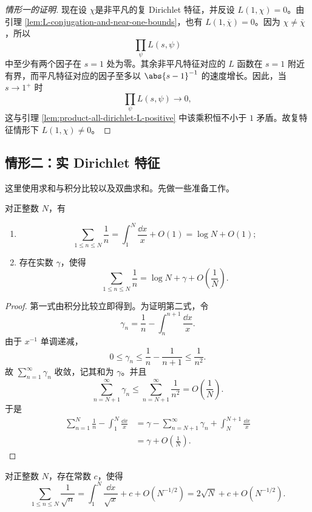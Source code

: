\begin{proof}[情形一的证明]
	现在设 $\chi$是非平凡的复 Dirichlet 特征，并反设
$L(1,\chi)=0$。由引理
\ref{lem:L-conjugation-and-near-one-bounds}，也有
$L(1,\overline\chi)=0$。因为 $\chi\neq\overline\chi$，所以
\[
\prod_\psi L(s,\psi)
\]
中至少有两个因子在 $s=1$ 处为零。其余非平凡特征对应的
$L$ 函数在 $s=1$ 附近有界，而平凡特征对应的因子至多以
$\abs{s-1}^{-1}$ 的速度增长。因此，当 $s\to1^+$ 时
	\[
	\prod_\psi L(s,\psi)\longrightarrow0,
	\]
	这与引理 \ref{lem:product-all-dirichlet-L-positive} 中该乘积恒不小于
$1$ 矛盾。故复特征情形下 $L(1,\chi)\neq0$。

\end{proof}
\subsection*{情形二：实 Dirichlet 特征}

这里使用求和与积分比较以及双曲求和。先做一些准备工作。

\begin{proposition}\label{prop:harmonic-sum-asymptotic}
	对正整数 $N$，有
	\begin{enumerate}[label=\textup{(\roman*)}]
		\item
		\[
		\sum_{1\leq n\leq N}\frac1n
		=\int_1^N\frac{\dd x}{x}+O(1)
		=\log N+O(1);
		\]
		\item 存在实数 $\gamma$，使得
		\[
		\sum_{1\leq n\leq N}\frac1n
		=\log N+\gamma+O\left(\frac1N\right).
		\]
	\end{enumerate}
\end{proposition}

\begin{proof}
	第一式由积分比较立即得到。为证明第二式，令
	\[
	\gamma_n=\frac1n-\int_n^{n+1}\frac{\dd x}{x}.
	\]
	由于 $x^{-1}$ 单调递减，
	\[
	0\leq\gamma_n
	\leq\frac1n-\frac1{n+1}
	\leq\frac1{n^2}.
	\]
	故 $\sum\limits_{n=1}^{\infty}\gamma_n$ 收敛，记其和为 $\gamma$。并且
	\[
	\sum_{n=N+1}^{\infty}\gamma_n
	\leq\sum_{n=N+1}^{\infty}\frac1{n^2}
	=O\left(\frac1N\right).
	\]
	于是
	\[
	\begin{aligned}
	\sum_{n=1}^{N}\frac1n-\int_1^N\frac{\dd x}{x}
	&=\gamma-\sum_{n=N+1}^{\infty}\gamma_n
	+\int_N^{N+1}\frac{\dd x}{x}\\
	&=\gamma+O\left(\frac1N\right).
	\end{aligned}
	\]
\end{proof}

\begin{proposition}\label{prop:square-root-sum-asymptotic}
	对正整数 $N$，存在常数 $c$，使得
	\[
	\sum_{1\leq n\leq N}\frac1{\sqrt n}
	=\int_1^N\frac{\dd x}{\sqrt x}+c
	+O\left(N^{-1/2}\right)
	=2\sqrt N+c+O\left(N^{-1/2}\right).
	\]
\end{proposition}

